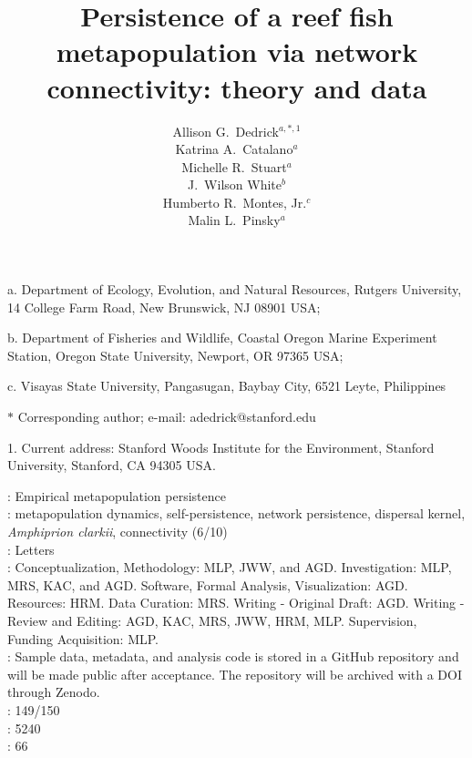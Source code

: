 \documentclass[12pt, oneside]{article}   	%
\author{}
\author{Allison G.\ Dedrick$^{a, \ast, 1}$ \\
Katrina A.\ Catalano$^a$ \\
Michelle R.\ Stuart$^a$ \\
J.\ Wilson White$^b$ \\
Humberto R.\ Montes, Jr.$^c$ \\
Malin L.\ Pinsky$^a$}
\title{Persistence of a reef fish metapopulation via network connectivity: theory and data}
\date{}
\begin{document}
\renewcommand{\topfraction}{0.95}
\maketitle{}

\noindent{} a. Department of Ecology, Evolution, and Natural Resources, Rutgers University, 14 College Farm Road, New Brunswick, NJ 08901 USA;

\noindent{} b. Department of Fisheries and Wildlife, Coastal Oregon Marine Experiment Station, Oregon State University, Newport, OR 97365 USA;

\noindent{} c. Visayas State University, Pangasugan, Baybay City, 6521 Leyte, Philippines

\noindent{} $\ast$ Corresponding author; e-mail: adedrick@stanford.edu

\noindent{} 1. Current address: Stanford Woods Institute for the Environment, Stanford University, Stanford, CA 94305 USA.

: Empirical metapopulation persistence \\

: metapopulation dynamics, self-persistence, network persistence, dispersal kernel, \textit{Amphiprion clarkii}, connectivity (6/10) \\ 

: Letters \\ 

: Conceptualization, Methodology: MLP, JWW, and AGD. Investigation: MLP, MRS, KAC, and AGD. Software, Formal Analysis, Visualization: AGD. Resources: HRM. Data Curation: MRS. Writing - Original Draft: AGD. Writing - Review and Editing: AGD, KAC, MRS, JWW, HRM, MLP. Supervision, Funding Acquisition: MLP.  \\

: Sample data, metadata, and analysis code is stored in a GitHub repository and will be made public after acceptance. The repository will be archived with a DOI through Zenodo. \\

: 149/150\\ 

: 5240 \\ 

: 66 \\ 
\end{document}
